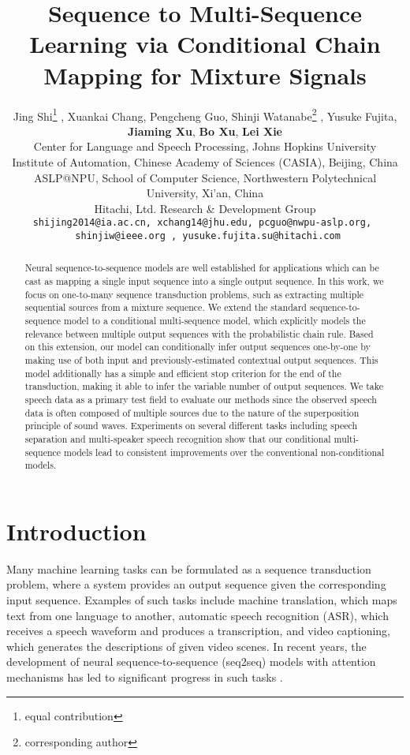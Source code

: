 \documentclass{article}
\title{Sequence to Multi-Sequence Learning via Conditional Chain Mapping for Mixture Signals}
\author{
Jing Shi\thanks{equal contribution} ,  Xuankai Chang, Pengcheng Guo, Shinji Watanabe\thanks{corresponding author} ,  Yusuke Fujita,\\ 
\textbf{Jiaming Xu}, \textbf{Bo Xu}, \textbf{Lei Xie}\\
Center for Language and Speech Processing, Johns Hopkins University\\
Institute of Automation, Chinese Academy of Sciences (CASIA), Beijing, China\\
ASLP@NPU, School of Computer Science, Northwestern Polytechnical University, Xi’an, China\\
Hitachi, Ltd. Research \& Development Group\\
\texttt{shijing2014@ia.ac.cn, xchang14@jhu.edu, pcguo@nwpu-aslp.org, } \\
\texttt{ shinjiw@ieee.org \Letter, yusuke.fujita.su@hitachi.com}
}
\begin{document}

\maketitle

\begin{abstract}
Neural sequence-to-sequence models are well established for applications which can be cast as mapping a single input sequence into a single output sequence. 
In this work, we focus on one-to-many sequence transduction problems, such as extracting multiple sequential sources from a mixture sequence.
We extend the standard sequence-to-sequence model to a conditional multi-sequence model, which explicitly models the relevance between multiple output sequences with the probabilistic chain rule.
Based on this extension, our model can conditionally infer output sequences one-by-one by making use of both input and previously-estimated contextual output sequences.
This model additionally has a simple and efficient stop criterion for the end of the transduction, making it able to infer the variable number of output sequences.
We take speech data as a primary test field to evaluate our methods since the observed speech data is often composed of multiple sources due to the nature of the superposition principle of sound waves.
Experiments on several different tasks including speech separation and multi-speaker speech recognition show that our conditional multi-sequence models lead to consistent improvements over the conventional non-conditional models.


\end{abstract}

\section{Introduction}\label{sec:intro}
Many machine learning tasks can be formulated as a sequence transduction problem, where a system provides an output sequence given the corresponding input sequence.
Examples of such tasks include machine translation, which maps text from one language to another, automatic speech recognition (ASR), which receives a speech waveform and produces a transcription, and video captioning, which generates the descriptions of given video scenes.
In recent years, the development of neural sequence-to-sequence (seq2seq) models \cite{cho2014learning,sutskever2014sequence} with attention mechanisms has led to significant progress in such tasks \cite{bahdanau2015neural,yao2015describing,venugopalan2015sequence,wu2016google,chorowski2015attention,chan2016listen}.
\end{document}
